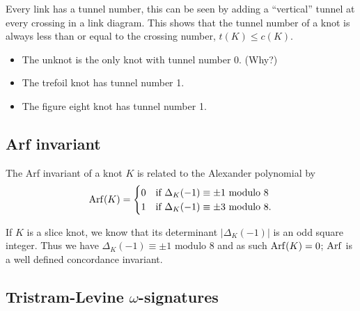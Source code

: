 \begin{remark}
	Every link has a tunnel number, this can be seen by adding a ``vertical''
	tunnel at every crossing in a link diagram.
	This shows that the tunnel number of a knot is always less than or equal
	to the crossing number, $t(K) \le c(K)$.
\end{remark}

\begin{example}
	\begin{itemize}
		\item The unknot is the only knot with tunnel number 0. (Why?)
		\item The trefoil knot has tunnel number 1.
		\item The figure eight knot has tunnel number 1.
	\end{itemize}
\end{example}



\subsection{Arf invariant}

\begin{theorem}
	The Arf invariant of a knot $K$ is related to the Alexander polynomial by
	\begin{equation*}
		\operatorname{Arf}(K) =
		\begin{cases}
			0 & \textrm{if } \Delta_{K}(-1) \equiv \pm 1 \textrm{ modulo } 8 \\
			1 & \textrm{if } \Delta_{K}(-1) \equiv \pm 3 \textrm{ modulo } 8.
		\end{cases}
	\end{equation*}
\end{theorem}

\begin{remark}
	If $K$ is a slice knot, we know that its determinant
	$| \Delta_{K}(-1) |$ is an odd square integer.
	Thus we have $\Delta_{K}(-1) \equiv \pm 1 \textrm{ modulo } 8$
	and as such $\operatorname{Arf}(K) = 0$; $\operatorname{Arf}$ is a well defined concordance invariant.
\end{remark}


\subsection{Tristram-Levine $\omega$-signatures}

